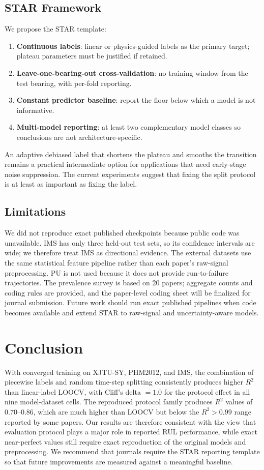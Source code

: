 \documentclass[5p,twocolumn]{elsarticle}
\begin{document}
\subsection{STAR Framework}
We propose the STAR template:
\begin{enumerate}
    \item \textbf{Continuous labels}: linear or physics-guided labels as the primary target; plateau parameters must be justified if retained.
    \item \textbf{Leave-one-bearing-out cross-validation}: no training window from the test bearing, with per-fold reporting.
    \item \textbf{Constant predictor baseline}: report the floor below which a model is not informative.
    \item \textbf{Multi-model reporting}: at least two complementary model classes so conclusions are not architecture-specific.
\end{enumerate}
An adaptive debiased label that shortens the plateau and smooths the transition remains a practical intermediate option for applications that need early-stage noise suppression. The current experiments suggest that fixing the split protocol is at least as important as fixing the label.

\subsection{Limitations}
We did not reproduce exact published checkpoints because public code was unavailable. IMS has only three held-out test sets, so its confidence intervals are wide; we therefore treat IMS as directional evidence. The external datasets use the same statistical feature pipeline rather than each paper's raw-signal preprocessing. PU is not used because it does not provide run-to-failure trajectories. The prevalence survey is based on 20 papers; aggregate counts and coding rules are provided, and the paper-level coding sheet will be finalized for journal submission. Future work should run exact published pipelines when code becomes available and extend STAR to raw-signal and uncertainty-aware models.

\section{Conclusion}
With converged training on XJTU-SY, PHM2012, and IMS, the combination of piecewise labels and random time-step splitting consistently produces higher $R^2$ than linear-label LOOCV, with Cliff's delta $=1.0$ for the protocol effect in all nine model-dataset cells. The reproduced protocol family produces $R^2$ values of $0.70$--$0.86$, which are much higher than LOOCV but below the $R^2>0.99$ range reported by some papers. Our results are therefore consistent with the view that evaluation protocol plays a major role in reported RUL performance, while exact near-perfect values still require exact reproduction of the original models and preprocessing. We recommend that journals require the STAR reporting template so that future improvements are measured against a meaningful baseline.
\end{document}
